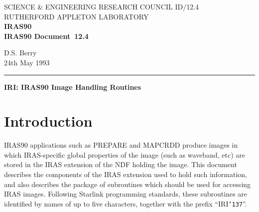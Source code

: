 \pagestyle{myheadings}

\newcommand{\irasdoccategory}  {IRAS90 Document}
\newcommand{\irasdocinitials}  {ID}
\newcommand{\irasdocnumber}    {12.4}
\newcommand{\irasdocauthors}   {D.S. Berry}
\newcommand{\irasdocdate}      {24th May 1993}
\newcommand{\irasdoctitle}     {IRI: IRAS90 Image Handling Routines}

\newcommand{\numcir}[1]{\mbox{\hspace{3ex}$\bigcirc$\hspace{-1.7ex}{\small #1}}}
\newcommand{\irasdocname}{\irasdocinitials /\irasdocnumber}
\renewcommand{\_}{{\tt\char'137}}     %
\markright{\irasdocname}
\setlength{\textwidth}{160mm}
\setlength{\textheight}{240mm}
\setlength{\topmargin}{-5mm}
\setlength{\oddsidemargin}{0mm}
\setlength{\evensidemargin}{0mm}
\setlength{\parindent}{0mm}
\setlength{\parskip}{\medskipamount}
\setlength{\unitlength}{1mm}



\thispagestyle{empty}
SCIENCE \& ENGINEERING RESEARCH COUNCIL \hfill \irasdocname\\
RUTHERFORD APPLETON LABORATORY\\
{\large\bf IRAS90\\}
{\large\bf \irasdoccategory\ \irasdocnumber}
\begin{flushright}
\irasdocauthors\\
\irasdocdate
\end{flushright}
\vspace{-4mm}
\rule{\textwidth}{0.5mm}
\vspace{5mm}
\begin{center}
{\Large\bf \irasdoctitle}
\end{center}
\vspace{5mm}
\setlength{\parskip}{0mm}
\tableofcontents
\setlength{\parskip}{\medskipamount}
\markright{\irasdocname}

\section{Introduction}
IRAS90 applications such as PREPARE and MAPCRDD produce images in which
IRAS-specific global properties of the image (such as waveband, etc) are stored
in the IRAS extension of the NDF holding the image. This document describes the
components of the IRAS extension used to hold such information, and also
describes the package of subroutines which should be used for accessing IRAS
images. Following Starlink programming standards, these subroutines are
identified by names of up to five characters, together with the prefix
``IRI\_''.

